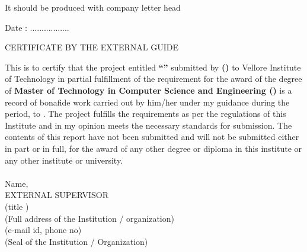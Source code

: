 \centering
\begin{center}
	\Large{It should be produced with company letter head}	
\end{center}
\vspace{1em}
\raggedleft
Date : .................
\linebreak \vspace{1em}
\begin{center}
	\Large{CERTIFICATE BY THE EXTERNAL GUIDE}	
\end{center}

\begin{flushleft}
\justifying
This is to certify that the project entitled \textbf{``\thesistitle''} submitted by \textbf{\studentname \; (\studentregno)} to Vellore Institute of Technology  in partial fulfillment of the requirement for the award of the degree of  \textbf{Master of Technology in Computer Science and Engineering (\specialization)} is a record of bonafide work carried out by him/her under my guidance during the period, \textbf{\projstartdate} to \textbf{\projenddate}.  The project fulfills the requirements as per the regulations of this Institute and in my opinion meets the necessary standards for submission.   The contents of this report have not been submitted and will not be submitted either in part or in full, for the award of any other degree or diploma in this institute or any other institute or university.	
\end{flushleft}
\paragraph{}
\vspace{1cm}
Name, \\
\vspace{1cm}
\large{EXTERNAL SUPERVISOR} \\
(title ) \\
(Full address of the Institution / organization) \\
(e-mail id, phone no) \\
(Seal of the Institution / Organization)
\pagebreak
